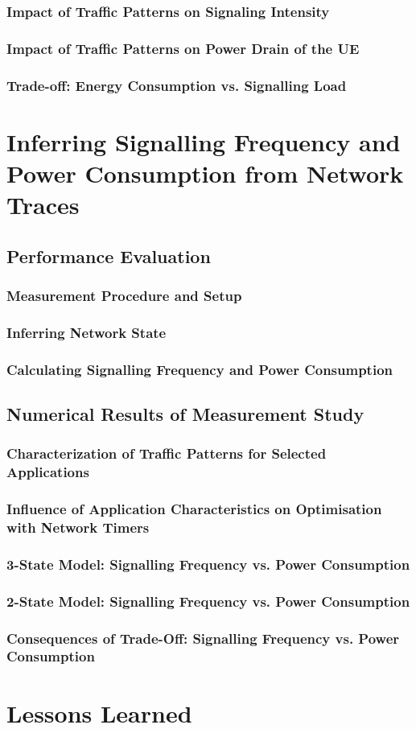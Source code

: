 \subsubsection*{Impact of Traffic Patterns on Signaling Intensity}
\subsubsection*{Impact of Traffic Patterns on Power Drain of the UE}
\subsubsection*{Trade-off: Energy Consumption vs. Signalling Load}

\section{Inferring Signalling Frequency and Power Consumption from
Network Traces}
\cite{Schwartz2013a}
\subsection{Performance Evaluation}
\subsubsection{Measurement Procedure and Setup}
\subsubsection*{Inferring Network State}
\subsubsection*{Calculating Signalling Frequency and Power Consumption}

\subsection{Numerical Results of Measurement Study}
\subsubsection*{Characterization of Traffic Patterns for Selected Applications}
\subsubsection*{Influence of Application Characteristics on Optimisation with Network Timers}
\subsubsection*{3-State Model: Signalling Frequency vs. Power Consumption}
\subsubsection*{2-State Model: Signalling Frequency vs. Power Consumption}
\subsubsection*{Consequences of Trade-Off: Signalling Frequency vs. Power Consumption}




\section{Lessons Learned}